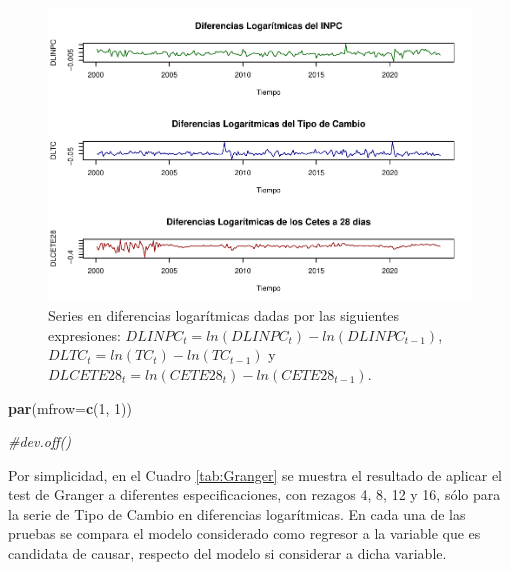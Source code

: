 \documentclass[
]{book}
\newenvironment{Shaded}{\begin{snugshade}}{\end{snugshade}}
\newcommand{\AttributeTok}[1]{\textcolor[rgb]{0.13,0.29,0.53}{#1}}
\newcommand{\CommentTok}[1]{\textcolor[rgb]{0.56,0.35,0.01}{\textit{#1}}}
\newcommand{\DecValTok}[1]{\textcolor[rgb]{0.00,0.00,0.81}{#1}}
\newcommand{\FunctionTok}[1]{\textcolor[rgb]{0.13,0.29,0.53}{\textbf{#1}}}
\newcommand{\NormalTok}[1]{#1}
\begin{document}
\begin{figure}

{\centering \includegraphics{Notas-Series-Tiempo_files/figure-latex/fig61-1} 

}

\caption{Series en diferencias logarítmicas dadas por las siguientes expresiones: $DLINPC_t = ln(DLINPC_t) - ln(DLINPC_{t-1})$, $DLTC_t = ln(TC_t) - ln(TC_{t-1})$ y $DLCETE28_t = ln(CETE28_t) - ln(CETE28_{t-1})$.}\label{fig:fig61}
\end{figure}

\begin{Shaded}
\begin{Highlighting}[]
\FunctionTok{par}\NormalTok{(}\AttributeTok{mfrow=}\FunctionTok{c}\NormalTok{(}\DecValTok{1}\NormalTok{, }\DecValTok{1}\NormalTok{))}

\CommentTok{\#dev.off()}
\end{Highlighting}
\end{Shaded}

Por simplicidad, en el Cuadro \ref{tab:Granger} se muestra el resultado de aplicar el test de Granger a diferentes especificaciones, con rezagos 4, 8, 12 y 16, sólo para la serie de Tipo de Cambio en diferencias logarítmicas. En cada una de las pruebas se compara el modelo considerado como regresor a la variable que es candidata de causar, respecto del modelo si considerar a dicha variable.
\end{document}
